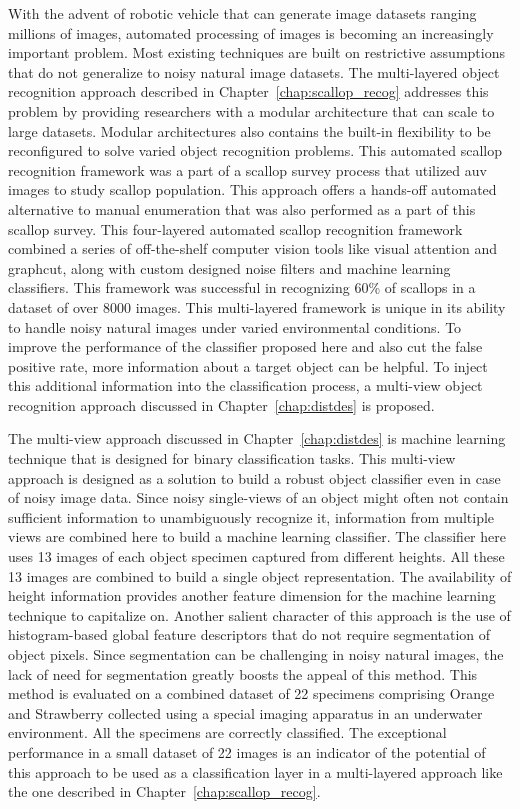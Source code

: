 \documentclass {udthesis}
\begin{document}
With the advent of robotic vehicle that can generate image datasets ranging millions of images, automated processing of images is becoming an increasingly important problem. Most existing techniques are built on restrictive assumptions that do not generalize to noisy natural image datasets. The multi-layered object recognition approach described in Chapter~\ref{chap:scallop_recog} addresses this problem
by providing researchers with a modular architecture that can scale to large datasets. Modular architectures also contains the built-in flexibility to be reconfigured to solve varied object recognition problems.
This automated scallop recognition framework was a part of a scallop survey process that utilized \gls{auv} images to study scallop population. This approach offers a hands-off automated alternative to manual enumeration that was also performed as a part of this scallop survey.
This four-layered automated scallop recognition framework combined a series of off-the-shelf computer vision tools like visual attention and graphcut, 
along with custom designed noise filters and machine learning classifiers.
This framework was successful in recognizing 60\% of scallops in a dataset of over 8000 images.
This multi-layered framework is unique in its ability to handle noisy natural images under varied environmental conditions.
To improve the performance of the classifier proposed here and also cut the false positive rate, more information about a target object can be helpful.
To inject this additional information into the classification process, a multi-view object recognition approach discussed in Chapter~\ref{chap:distdes} is proposed.

The multi-view approach discussed in Chapter~\ref{chap:distdes} is machine learning technique that is designed for binary classification tasks. 
This multi-view approach is designed as a solution to build a robust object classifier even in case of noisy image data.
Since noisy single-views of an object might often not contain sufficient information to unambiguously recognize it, information from multiple views are combined 
here to build a machine learning classifier. The classifier here uses 13 images of each object specimen captured from different heights.
All these 13 images are combined to build a single object representation.
The availability of height information provides another feature dimension for the machine learning technique to capitalize on.
Another salient character of this approach is the use of histogram-based global feature descriptors that do not
require segmentation of object pixels. Since segmentation can be challenging in noisy natural images, the lack of need for segmentation greatly boosts the appeal of this method. This method is evaluated on a combined dataset of 22 specimens comprising Orange and Strawberry collected using a special imaging apparatus in an underwater environment.
All the specimens are correctly classified. The exceptional performance in a small dataset of 22 images is an indicator of the potential of this approach to be used as a classification layer in a multi-layered approach like the one described in Chapter~\ref{chap:scallop_recog}.
\end{document}
